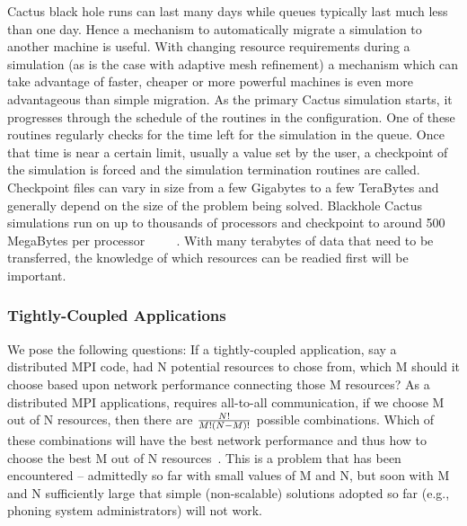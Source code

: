 \documentclass[conference,final]{IEEEtran}
\begin{document}
{Cactus black hole runs can last many days while queues typically last
much less than one day. Hence a mechanism to automatically migrate a
simulation to another machine is useful. With changing resource
requirements during a simulation (as is the case with adaptive mesh
refinement) a mechanism which can take advantage of faster, cheaper or
more powerful machines is even more advantageous than simple
migration. As the primary Cactus simulation starts, it progresses
through the schedule of the routines in the configuration. One of
these routines regularly checks for the time left for the simulation
in the queue. Once that time is near a certain limit, usually a value
set by the user, a checkpoint of the simulation is forced and the
simulation termination routines are called. Checkpoint files can vary
in size from a few Gigabytes to a few TeraBytes and generally depend
on the size of the problem being solved. Blackhole Cactus simulations
run on up to thousands of processors and checkpoint to around 500
MegaBytes per processor ~\cite{Cactus_CCTTR} ~\cite{Cactus_Kamil06a}
~\cite{Cactus_Shalf05a}. With many terabytes of data that need to be
transferred, the knowledge of which resources can be readied first
will be important.

\subsubsection{Tightly-Coupled Applications}

We pose the following questions: If a tightly-coupled application, say
a distributed MPI code, had N potential resources to chose from, which
M should it choose based upon network performance connecting those M
resources?  As a distributed MPI applications, requires all-to-all
communication, if we choose M out of N resources, then there are $N!
\over M! (N-M)!$ possible combinations.  Which of these combinations
will have the best network performance and thus how to choose the best
M out of N resources~\cite{clade06}.  This is a problem that has been
encountered -- admittedly so far with small values of M and N, but
soon with M and N sufficiently large that simple (non-scalable)
solutions adopted so far (e.g., phoning system administrators) will not
work.

}
\end{document}

